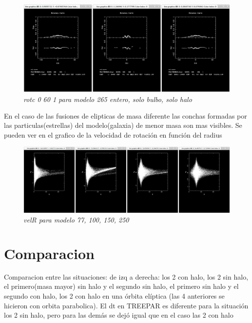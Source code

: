 \documentclass[12pt]{book}
\begin{document}
\begin{figure}[h!]
 \centering
 \includegraphics[scale=0.2]{rotc265-0-60-1-all.png}
 \caption{\emph{rotc 0 60 1 para modelo 265 entero, solo bulbo, solo halo}}
 \label{Fig: 5}
\end{figure}

En el caso de las fusiones de elipticas de masa diferente las conchas formadas por las particulas(estrellas) del modelo(galaxia) de menor masa son mas visibles. Se pueden ver en el grafico de la velocidad de rotación en función del radius

\begin{figure}[h!]
 \centering
 \includegraphics[scale=0.2]{shell.png}
 \caption{\emph{velR para modelo 77, 100, 150, 250}}
 \label{Fig: 5}
\end{figure}

\section*{Comparacion}

Comparacion entre las situaciones: de izq a derecha:
los 2 con halo, los 2 sin halo, el primero(masa mayor) sin halo y el segundo sin halo, el primero sin halo y el segundo con halo, los 2 con halo en una órbita elíptica (las 4 anteriores se hicieron con orbita parabolica).
El dt en TREEPAR es diferente para la situación los 2 sin halo, pero para las demás se dejó igual que en el caso las 2 con halo
\end{document}
